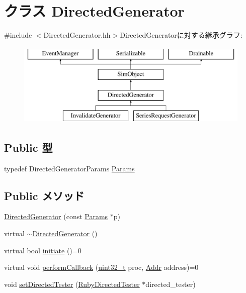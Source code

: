 \hypertarget{classDirectedGenerator}{
\section{クラス DirectedGenerator}
\label{classDirectedGenerator}
}


{\ttfamily \#include $<$DirectedGenerator.hh$>$}DirectedGeneratorに対する継承グラフ:\begin{figure}[H]
\begin{center}
\leavevmode
\includegraphics[height=4cm]{classDirectedGenerator}
\end{center}
\end{figure}
\subsection*{Public 型}
\begin{DoxyCompactItemize}
\item 
typedef DirectedGeneratorParams \hyperlink{classDirectedGenerator_ac723463fca65df4ca9fb4e67caddf417}{Params}
\end{DoxyCompactItemize}
\subsection*{Public メソッド}
\begin{DoxyCompactItemize}
\item 
\hyperlink{classDirectedGenerator_af37b4a52922bc83f0c89a14542f01adf}{DirectedGenerator} (const \hyperlink{classDirectedGenerator_ac723463fca65df4ca9fb4e67caddf417}{Params} $\ast$p)
\item 
virtual \hyperlink{classDirectedGenerator_afb34ab7698dd5acf94263cc1664d8ac0}{$\sim$DirectedGenerator} ()
\item 
virtual bool \hyperlink{classDirectedGenerator_a1c6f0032904b7bd7035a5cb7c88a8354}{initiate} ()=0
\item 
virtual void \hyperlink{classDirectedGenerator_a5aad2098d3cbda728f41beff10faea99}{performCallback} (\hyperlink{Type_8hh_a435d1572bf3f880d55459d9805097f62}{uint32\_\-t} proc, \hyperlink{base_2types_8hh_af1bb03d6a4ee096394a6749f0a169232}{Addr} address)=0
\item 
void \hyperlink{classDirectedGenerator_a15c714f94db09a1d209a3e72bb023bf3}{setDirectedTester} (\hyperlink{classRubyDirectedTester}{RubyDirectedTester} $\ast$directed\_\-tester)
\end{DoxyCompactItemize}
